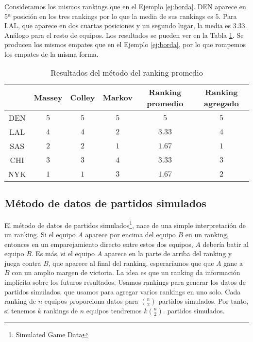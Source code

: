 \begin{ejemplo}
Consideramos los mismos rankings que en el Ejemplo \ref{ej:borda}. DEN aparece en 5ª posición en los tres rankings por lo que la media de sus rankings es $5$. Para LAL, que aparece en dos cuartas posiciones y un segundo lugar, la media es $3.33$. Análogo para el resto de equipos. Los resultados se pueden ver en la Tabla \ref{tbl:promedio_resultados}. Se producen los mismos empates que en el Ejemplo \ref{ej:borda}, por lo que rompemos los empates de la misma forma.

\begin{table}[h]
\centering
\caption{Resultados del método del ranking promedio}
\label{tbl:promedio_resultados}
\begin{tabular}{@{}cccccc@{}}
\cmidrule(l){2-6}
    & Massey & Colley & Markov & Ranking promedio & Ranking agregado \\ \midrule
DEN & $5$    & $5$    & $5$    & $5$              & $5$              \\
LAL & $4$    & $4$    & $2$    & $3.33$           & $4$              \\
SAS & $2$    & $2$    & $1$    & $1.67$           & $1$              \\
CHI & $3$    & $3$    & $4$    & $3.33$           & $3$              \\
NYK & $1$    & $1$    & $3$    & $1.67$           & $2$              \\ \bottomrule
\end{tabular}
\end{table}

\end{ejemplo}


\subsection{Método de datos de partidos simulados}

El método de datos de partidos simulados\footnote{Simulated Game Data}, nace de una simple interpretación de un ranking. Si el equipo $A$ aparece por encima del equipo $B$ en un ranking, entonces en un emparejamiento directo entre estos dos equipos, $A$ debería batir al equipo $B$. Es más, si el equipo $A$ aparece en la parte de arriba del ranking y juega contra $B$, que aparece al final del ranking, esperaríamos que que $A$ gane a $B$ con un amplio margen de victoria. La idea es que un ranking da información implícita sobre los futuros resultados. Usamos rankings para generar los datos de partidos simulados, que usamos para agregar varios rankings en uno solo. Cada ranking de $n$ equipos proporciona datos para $\binom{n}{2}$ partidos simulados. Por tanto, si tenemos $k$ rankings de $n$ equipos tendremos $k \binom{n}{2}$. partidos simulados.\\

